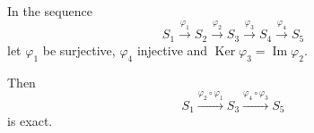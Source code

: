 In the sequence
$$S_1 \xrightarrow{\varphi_1} S_2 \xrightarrow{\varphi_2} S_3 \xrightarrow{\varphi_3} S_4 \xrightarrow{\varphi_4} S_5$$
let $\varphi_1$ be surjective, $\varphi_4$ injective and $\operatorname{Ker} \varphi_3 = \operatorname{Im} \varphi_2$.

Then
$$S_1 \xrightarrow{\varphi_2 \circ \varphi_1} S_3 \xrightarrow{\varphi_4 \circ \varphi_3} S_5$$
is exact.
